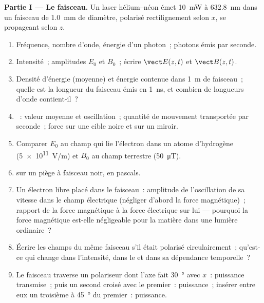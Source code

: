\begin{problem}
\label{pb:b2:plane-waves-polarization:1}

\medskip
\noindent\textbf{Partie I --- Le faisceau.}
Un laser hélium--néon émet \qty{10}{mW} à \qty{632.8}{nm} dans un faisceau de
\qty{1.0}{mm} de diamètre, polarisé rectilignement selon $x$, se propageant selon
$z$.
\begin{enumerate}
  \item Fréquence, nombre d'onde, énergie d'un photon~; photons émis par
        seconde.
  \item Intensité~; amplitudes $E_0$ et $B_0$~; écrire $\vect E(z, t)$ et
        $\vect B(z, t)$.
  \item Densité d'énergie (moyenne) et énergie contenue dans \qty{1}{m} de
        faisceau~; quelle est la longueur du faisceau émis en \qty{1}{ns}, et combien de
        longueurs d'onde contient-il~?
  \item {}~: valeur moyenne et oscillation~; quantité de mouvement
        transportée par seconde~; force sur une cible noire et sur un miroir.
  \item Comparer $E_0$ au champ qui lie l'électron dans un
        atome d'hydrogène (\qty{5e11}{V/m}) et $B_0$ au champ terrestre
        (\qty{50}{\micro T}).
  \item {} sur un piège à faisceau noir, en pascals.
  \item Un électron libre placé dans le faisceau~: amplitude de l'oscillation de sa
        vitesse dans le champ électrique (négliger d'abord la force
        magnétique)~; rapport de la force magnétique à la force électrique sur lui ---
        pourquoi la force magnétique est-elle négligeable pour la matière dans une lumière ordinaire~?
  \item Écrire les champs du même faisceau s'il était polarisé
        circulairement~; qu'est-ce qui change dans l'intensité, dans le  et dans sa dépendance temporelle~?
  \item Le faisceau traverse un polariseur dont l'axe fait
        \qty{30}{\degree} avec $x$~: puissance transmise~; puis un second
        croisé avec le premier~: puissance~; insérer entre eux un
        troisième à \qty{45}{\degree} du premier~: puissance.
\end{enumerate}


\end{problem}
